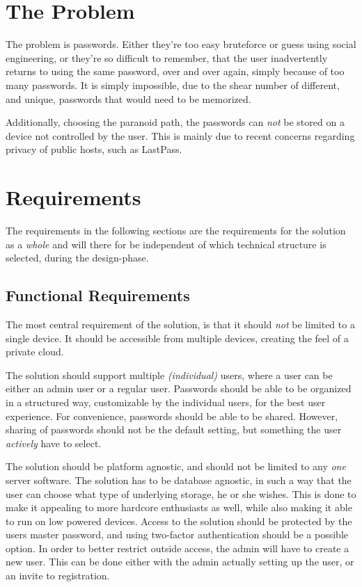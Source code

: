 	\section{The Problem}
		\label{chap:intro_sec:problem}
		The problem is passwords. Either they're too easy bruteforce or guess using social engineering, or they're so difficult to remember, that the user inadvertently returns to using the same password, over and over again, simply because of too many passwords. It is simply impossible, due to the shear number of different, and unique, passwords that would need to be memorized.

		Additionally, choosing the paranoid path, the passwords can \emph{not} be stored on a device not controlled by the user. This is mainly due to recent concerns regarding privacy of public hosts, such as LastPass.





	\section{Requirements}
		\label{sec:requirements}
		The requirements in the following sections are the requirements for the solution as a \emph{whole} and will there for be independent of which technical structure is selected, during the design-phase.



		\subsection*{Functional Requirements}
			The most central requirement of the solution, is that it should \emph{not} be limited to a single device. It should be accessible from multiple devices, creating the feel of a private cloud. 

			The solution should support multiple \emph{(individual)} users, where a user can be either an admin user or a regular user. Passwords should be able to be organized in a structured way, customizable by the individual users, for the best user experience. For convenience, passwords should be able to be shared. However, sharing of passwords should not be the default setting, but something the user \emph{actively} have to select.

			The solution should be platform agnostic, and should not be limited to any \emph{one} server software. The solution has to be database agnostic, in such a way that the user can choose what type of underlying storage, he or she wishes. This is done to make it appealing to more hardcore enthusiasts as well, while also making it able to run on low powered devices. Access to the solution should be protected by the users master password, and using two-factor authentication should be a possible option. In order to better restrict outside access, the admin will have to create a new user. This can be done either with the admin actually setting up the user, or an invite to registration.

